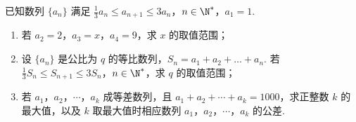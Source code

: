 \begin{problem}
已知数列 \(\{a_{n}\}\) 满足 \(\frac{1}{3} a_{n} \leqslant a_{n+1} \leqslant 3a_{n}\)，\(n \in \N^{*}\)，\(a_{1} = 1\).

\begin{enumerate}
\item 若 \(a_{2} = 2\)，\(a_{3} = x\)，\(a_{4} = 9\)，求 \(x\) 的取值范围；
\item 设 \(\{a_{n}\}\) 是公比为 \(q\) 的等比数列，\(S_{n} = a_{1} + a_{2} + \dots + a_{n}\). 若 \(\frac{1}{3} S_{n} \leqslant S_{n+1} \leqslant 3S_{n}\)，\(n \in \N^{*}\)，求 \(q\) 的取值范围；
\item 若 \(a_{1}\)，\(a_{2}\)，\(\cdots\)，\(a_{k}\) 成等差数列，且 \(a_{1} + a_{2} + \cdots + a_{k} = 1000\)，求正整数 \(k\) 的最大值，以及 \(k\) 取最大值时相应数列 \(a_{1}\)，\(a_{2}\)，\(\cdots\)，\(a_{k}\) 的公差.
\end{enumerate}
\end{problem}

